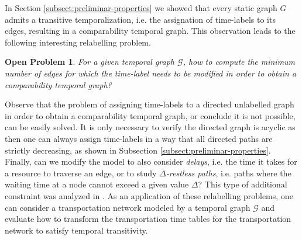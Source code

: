 \documentclass[runningheads]{llncs}
\newtheorem{PB}{Open Problem}
\begin{document}
In Section \ref{subsect:preliminar-properties} we showed that every static graph $G$ admits a transitive temporalization, i.e. the assignation of time-labels to its edges, resulting in a comparability temporal graph. This observation leads to the following interesting relabelling  problem.

\begin{PB}
\label{op:tto-editing-problem}
For a given temporal graph $\mathcal{G}$, how to compute the minimum number of edges for which the time-label needs to be modified in order to obtain a comparability temporal graph?
\end{PB}

Observe that the problem of assigning time-labels to a directed unlabelled graph in order to obtain a comparability temporal graph, or conclude it is not possible, can be easily solved. It is only necessary to verify the directed graph is acyclic as then one can always assign time-labels in a way that all directed paths are strictly decreasing, as shown in Subsection \ref{subsect:preliminar-properties}. Finally, can we modify the model to also consider \textit{delays}, i.e. the time it takes for a resource to traverse an edge, or to study \textit{$\Delta$-restless paths}, i.e. paths where the waiting time at a node cannot exceed a given value $\Delta$? This type of additional constraint was analyzed in \cite{cauvi2025parameterized}. As an application  of these relabelling problems, one can consider a transportation network modeled by a temporal graph $\mathcal{G}$ and evaluate how to transform the transportation time tables for the transportation network to satisfy temporal transitivity.

\end{document}

